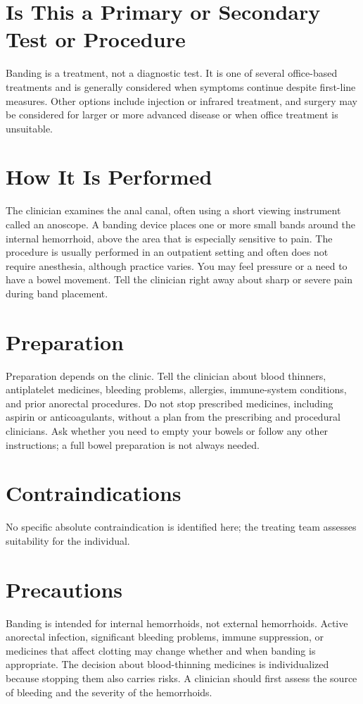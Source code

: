 \section*{Is This a Primary or Secondary Test or Procedure}
Banding is a treatment, not a diagnostic test. It is one of several office-based treatments and is generally considered when symptoms continue despite first-line measures. Other options include injection or infrared treatment, and surgery may be considered for larger or more advanced disease or when office treatment is unsuitable.

\section*{How It Is Performed}
The clinician examines the anal canal, often using a short viewing instrument called an anoscope. A banding device places one or more small bands around the internal hemorrhoid, above the area that is especially sensitive to pain. The procedure is usually performed in an outpatient setting and often does not require anesthesia, although practice varies. You may feel pressure or a need to have a bowel movement. Tell the clinician right away about sharp or severe pain during band placement.

\section*{Preparation}
Preparation depends on the clinic. Tell the clinician about blood thinners, antiplatelet medicines, bleeding problems, allergies, immune-system conditions, and prior anorectal procedures. Do not stop prescribed medicines, including aspirin or anticoagulants, without a plan from the prescribing and procedural clinicians. Ask whether you need to empty your bowels or follow any other instructions; a full bowel preparation is not always needed.

\section*{Contraindications}
No specific absolute contraindication is identified here; the treating team assesses suitability for the individual.

\section*{Precautions}
Banding is intended for internal hemorrhoids, not external hemorrhoids. Active anorectal infection, significant bleeding problems, immune suppression, or medicines that affect clotting may change whether and when banding is appropriate. The decision about blood-thinning medicines is individualized because stopping them also carries risks. A clinician should first assess the source of bleeding and the severity of the hemorrhoids.

